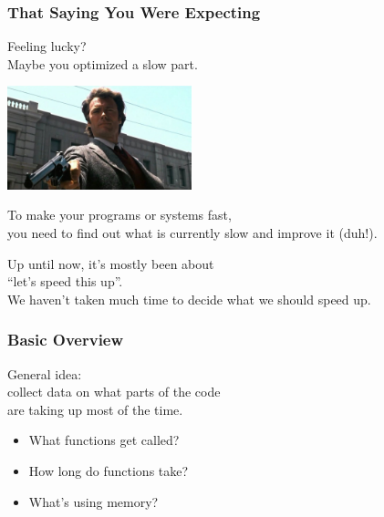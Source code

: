 \begin{frame}
\frametitle{That Saying You Were Expecting}


\begin{changemargin}{1.5cm}
Feeling lucky? \\
Maybe you optimized a slow part. 

\begin{center}
	\includegraphics[width=0.4\textwidth]{images/feellucky.jpg}
\end{center}

To make your programs or systems fast, \\
you need to find out what is currently slow and improve it (duh!). 

Up until now, it's mostly been about \\
\qquad ``let's speed this up''.\\
We haven't taken much time to decide what we should speed up.
\end{changemargin}

\end{frame}



\begin{frame}
\frametitle{Basic Overview}


\begin{changemargin}{1.5cm}
General idea:\\
\qquad collect data on what parts of the code\\
\qquad are taking up most of the time.

\begin{itemize}
\item What functions get called?
\item How long do functions take?
\item What's using memory?
\end{itemize}
\end{changemargin}

\end{frame}



